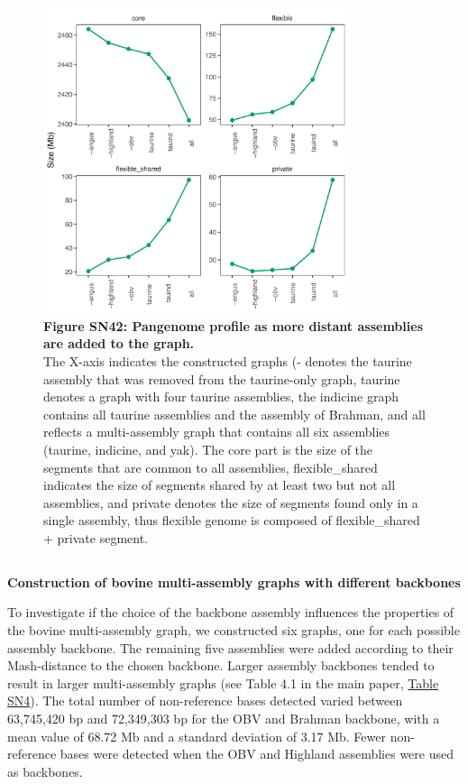\documentclass[../main.tex]{subfiles}
\begin{document}
\begin{flushleft}
\bigskip
\begin{figure}[!htb]
    \centering
    \includegraphics[width=0.8\textwidth]{paper3/supplement/sp416.pdf}
    \caption*{\textbf{\hypertarget{Figure SN42}{Figure SN42}: Pangenome profile as more distant assemblies are added to the graph.} \\
    \footnotesize{The X-axis indicates the constructed graphs (- denotes the taurine assembly that was removed from the taurine-only graph, taurine denotes a graph with four taurine assemblies, the indicine graph contains all taurine assemblies and the assembly of Brahman, and all reflects a multi-assembly graph that contains all six assemblies (taurine, indicine, and yak). The core part is the size of the segments that are common to all assemblies, flexible\_shared indicates the size of segments shared by at least two but not all assemblies, and private denotes the size of segments found only in a single assembly, thus flexible genome is composed of flexible\_shared + private segment.}}
\end{figure}


\subsection{}
\label{sup_not:s43}
\textbf{Construction of bovine multi-assembly graphs with different backbones}
\bigskip

To investigate if the choice of the backbone assembly influences the properties of the bovine multi-assembly graph, we constructed six graphs, one for each possible assembly backbone. The remaining five assemblies were added according to their Mash-distance to the chosen backbone. Larger assembly backbones tended to result in larger multi-assembly graphs (see Table 4.1 in the main paper, \hyperlink{Table SN4}{Table SN4}). The total number of non-reference bases detected varied between 63,745,420 bp and 72,349,303 bp for the OBV and Brahman backbone, with a mean value of 68.72 Mb and a standard deviation of 3.17 Mb. Fewer non-reference bases were detected when the OBV and Highland assemblies were used as backbones.
\bigskip


\end{flushleft}
\end{document}
